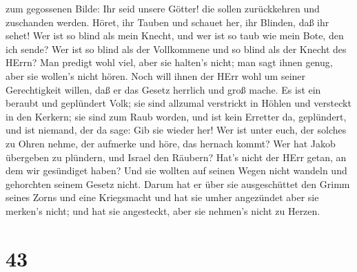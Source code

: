zum gegossenen Bilde: Ihr seid unsere Götter! die sollen zurückkehren
und zuschanden werden.  Höret, ihr Tauben und schauet her,
ihr Blinden, daß ihr sehet!  Wer ist so blind als mein
Knecht, und wer ist so taub wie mein Bote, den ich sende? Wer ist so
blind als der Vollkommene und so blind als der Knecht des HErrn?
 Man predigt wohl viel, aber sie halten's nicht; man sagt
ihnen genug, aber sie wollen's nicht hören.  Noch will
ihnen der HErr wohl um seiner Gerechtigkeit willen, daß er das Gesetz
herrlich und groß mache.  Es ist ein beraubt und geplündert
Volk; sie sind allzumal verstrickt in Höhlen und versteckt in den
Kerkern; sie sind zum Raub worden, und ist kein Erretter da, geplündert,
und ist niemand, der da sage: Gib sie wieder her!  Wer ist
unter euch, der solches zu Ohren nehme, der aufmerke und höre, das
hernach kommt?  Wer hat Jakob übergeben zu plündern, und
Israel den Räubern? Hat's nicht der HErr getan, an dem wir gesündiget
haben? Und sie wollten auf seinen Wegen nicht wandeln und gehorchten
seinem Gesetz nicht.  Darum hat er über sie ausgeschüttet
den Grimm seines Zorns und eine Kriegsmacht und hat sie umher angezündet
aber sie merken's nicht; und hat sie angesteckt, aber sie nehmen's nicht
zu Herzen.

\hypertarget{section-42}{%
\section{43}\label{section-42}}

